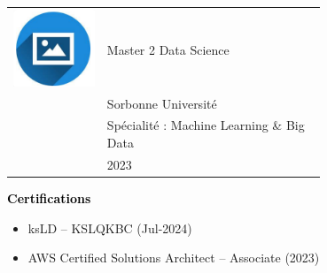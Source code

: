 \documentclass{article}
\begin{document}
\begin{paracol}{2}
 \begin{tabular}{@{}cp{0.7\linewidth}}
      \begin{minipage}{0.05\linewidth}
        \includegraphics[width=\linewidth]{picon.png}
      \end{minipage} & \vspace{-12pt}
      {\color{sidetext} {Master 2 Data Science}} \\[-6pt]
      & Sorbonne Université \\
      & Spécialité : Machine Learning \& Big Data \\
      & 2023 
    \end{tabular}

\vspace{0.5cm}

\textcolor{black}{\Large \textbf{Certifications}} \\

\begin{itemize}[leftmargin=12pt]
\item ksLD – KSLQKBC (Jul-2024)
\item AWS Certified Solutions Architect – Associate (2023)
\end{itemize}


\end{paracol}
\end{document}
